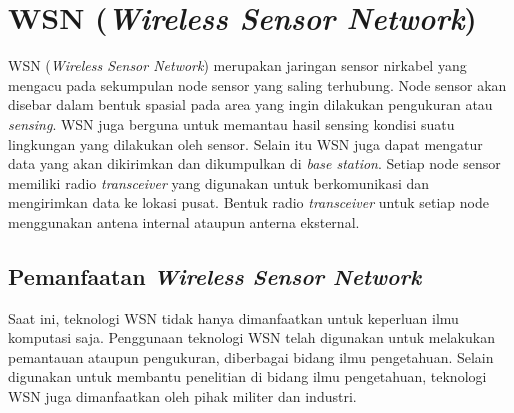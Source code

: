 \section{WSN (\textit{Wireless Sensor Network})}  
WSN (\textit{Wireless Sensor Network}) merupakan jaringan sensor nirkabel yang mengacu pada sekumpulan node sensor yang saling terhubung. Node sensor akan disebar dalam bentuk spasial pada area yang ingin dilakukan pengukuran atau \textit{sensing}. WSN juga berguna untuk memantau hasil sensing kondisi suatu lingkungan yang dilakukan oleh sensor. Selain itu WSN juga dapat mengatur data yang akan dikirimkan dan dikumpulkan di \textit{base station}.
Setiap node sensor memiliki radio \textit{transceiver} yang digunakan untuk berkomunikasi dan mengirimkan data ke lokasi pusat. Bentuk radio \textit{transceiver} untuk setiap node menggunakan antena internal ataupun anterna eksternal.

\subsection{Pemanfaatan \textit{Wireless Sensor Network}}
Saat ini, teknologi WSN tidak hanya dimanfaatkan untuk keperluan ilmu komputasi saja. Penggunaan teknologi WSN telah digunakan untuk melakukan pemantauan ataupun pengukuran, diberbagai bidang ilmu pengetahuan. Selain digunakan untuk membantu penelitian di bidang ilmu pengetahuan, teknologi WSN juga dimanfaatkan oleh pihak militer dan industri.

